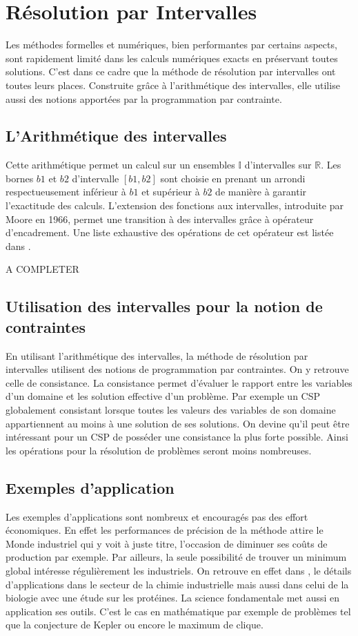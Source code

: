 \section{Résolution par Intervalles}
Les méthodes formelles et numériques, bien performantes par certains aspects, sont rapidement limité dans les calculs numériques exacts en préservant toutes solutions. C'est dans ce cadre que la méthode de résolution par intervalles ont toutes leurs places. Construite grâce à l'arithmétique des intervalles, elle utilise aussi des notions apportées par la programmation par contrainte.
 
\subsection{L'Arithmétique des intervalles}
Cette arithmétique permet un calcul sur un ensembles $\mathbb{I}$ d'intervalles sur $\mathbb{R}$. Les bornes $b1$ et $b2$ d'intervalle $[b1,b2]$ sont choisie en prenant un arrondi respectueusement inférieur à $b1$ et supérieur à $b2$ de manière à garantir l'exactitude des calculs. L'extension des fonctions aux intervalles, introduite par Moore en 1966, permet une transition à des intervalles grâce à opérateur d'encadrement. Une liste exhaustive des opérations de cet opérateur est listée dans \cite{Jermann}.

A COMPLETER

\subsection{Utilisation des intervalles pour la notion de contraintes}
En utilisant l'arithmétique des intervalles, la méthode de résolution par intervalles utilisent des notions de programmation par contraintes. On y retrouve celle de consistance. La consistance permet d'évaluer le rapport entre les variables d'un domaine et les solution effective d'un problème. Par exemple un CSP globalement consistant lorsque toutes les valeurs des variables de son domaine appartiennent au moins à une solution de ses solutions. On devine qu'il peut être intéressant pour un CSP de posséder une consistance la plus forte possible. Ainsi les opérations pour la résolution de problèmes seront moins nombreuses. 


\subsection{Exemples d'application}
Les exemples d'applications sont nombreux et encouragés pas des effort économiques. En effet les performances de précision de la méthode attire le Monde industriel qui y voit à juste titre, l'occasion de diminuer ses coûts de production par exemple. Par ailleurs, la seule possibilité de trouver un minimum global intéresse régulièrement les industriels. On retrouve en effet dans \cite{Schichl}, le détails d'applications dans le secteur de la chimie industrielle mais aussi dans celui de la biologie avec une étude sur les protéines.
 La science fondamentale met aussi en application ses outils. C'est le cas en mathématique par exemple de problèmes tel que la conjecture de Kepler ou encore le  maximum de clique.

